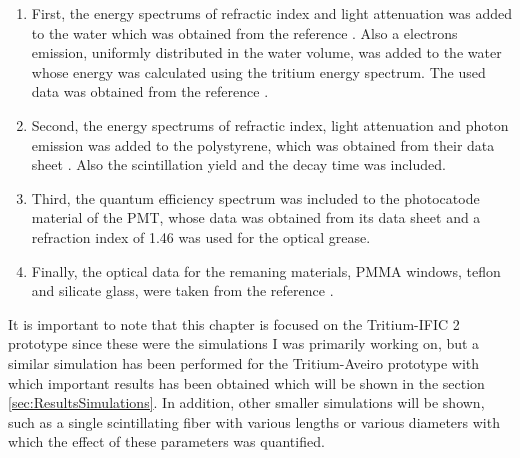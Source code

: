 \begin{enumerate}

\item{} First, the energy spectrums of refractic index and light attenuation was added to the water which was obtained from the reference \cite{WaterPropertiesSimulation}. Also a electrons emission, uniformly distributed in the water volume, was added to the water whose energy was calculated using the tritium energy spectrum. The used data was obtained from the reference \cite{TritiumEmissionSpectrum}.

\item{} Second, the energy spectrums of refractic index, light attenuation and photon emission was added to the polystyrene, which was obtained from their data sheet \cite{DataSheetBCF12Fiber}.  Also the scintillation yield and the decay time was included. 

\item{} Third, the quantum efficiency spectrum was included to the photocatode material of the PMT, whose data was obtained from its data sheet \cite{DataSheetPMTs} and a refraction index of 1.46 was used for the optical grease.

\item{} Finally, the optical data for the remaning materials, PMMA windows, teflon and silicate glass, were taken from the reference \cite{NEMODataSimulation}.

\end{enumerate} 

It is important to note that this chapter is focused on the Tritium-IFIC 2 prototype since these were the simulations I was primarily working on, but a similar simulation has been performed for the Tritium-Aveiro prototype with which important results has been obtained which will be shown in the section \ref{sec:ResultsSimulations}. In addition, other smaller simulations will be shown, such as a single scintillating fiber with various lengths or various diameters with which the effect of these parameters was quantified.